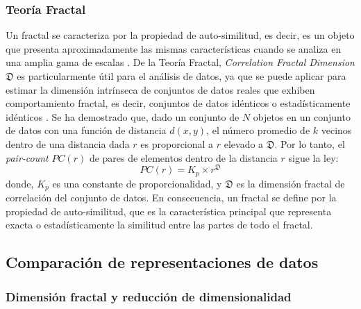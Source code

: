 \subsubsection{Teoría Fractal}
Un fractal se caracteriza por la propiedad de auto-similitud, es decir, es un objeto que presenta aproximadamente las mismas características cuando se analiza en una amplia gama de escalas \cite{DBLP:journals/jidm/TrainaTWF10}. De la Teoría Fractal, \textit{Correlation Fractal Dimension} $ \mathfrak{D} $ es particularmente útil para el análisis de datos, ya que se puede aplicar para estimar la dimensión intrínseca de conjuntos de datos reales que exhiben comportamiento fractal, es decir, conjuntos de datos idénticos o estadísticamente idénticos \cite{DBLP:fractal2016}. Se ha demostrado que, dado un conjunto de $ N $ objetos en un conjunto de datos con una función de distancia $ d(x, y) $, el número promedio de $ k $ vecinos dentro de una distancia dada $ r $ es proporcional a $ r $ elevado a $ \mathfrak{D} $. Por lo tanto, el \textit{pair-count} $ PC(r) $ de pares de elementos dentro de la distancia $ r $ sigue la ley:
\begin{equation}\label{eq:fractal}
       PC(r) = K_p \times r^{\mathfrak{D}}
    \end{equation}
    donde, $ K_p $ es una constante de proporcionalidad, y $ \mathfrak{D} $ es la dimensión fractal de correlación del conjunto de datos.
En consecuencia, un fractal se define por la propiedad de auto-similitud, que es la característica principal que representa exacta o estadísticamente la similitud entre las partes de todo el fractal.

\subsection{Comparación de representaciones de datos}
\subsubsection{Dimensión fractal y reducción de dimensionalidad}\label{sec:fractal-dimension}


